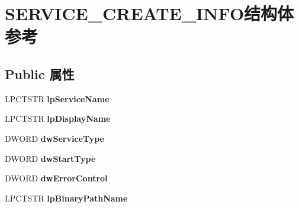 \hypertarget{struct_s_e_r_v_i_c_e___c_r_e_a_t_e___i_n_f_o}{}\section{S\+E\+R\+V\+I\+C\+E\+\_\+\+C\+R\+E\+A\+T\+E\+\_\+\+I\+N\+F\+O结构体 参考}
\label{struct_s_e_r_v_i_c_e___c_r_e_a_t_e___i_n_f_o}
\subsection*{Public 属性}
\begin{DoxyCompactItemize}
\item 
\mbox{\label{struct_s_e_r_v_i_c_e___c_r_e_a_t_e___i_n_f_o_a13f8b1a8b036ca8a352d57bd00c89f71}} 
L\+P\+C\+T\+S\+TR {\bfseries lp\+Service\+Name}
\item 
\mbox{\label{struct_s_e_r_v_i_c_e___c_r_e_a_t_e___i_n_f_o_a2c0913f2098752c80e56b44d23f64e72}} 
L\+P\+C\+T\+S\+TR {\bfseries lp\+Display\+Name}
\item 
\mbox{\label{struct_s_e_r_v_i_c_e___c_r_e_a_t_e___i_n_f_o_a0339718a3da79ed61168471585b0e8a9}} 
D\+W\+O\+RD {\bfseries dw\+Service\+Type}
\item 
\mbox{\label{struct_s_e_r_v_i_c_e___c_r_e_a_t_e___i_n_f_o_ad801772102f8029fc828d1596b6529c1}} 
D\+W\+O\+RD {\bfseries dw\+Start\+Type}
\item 
\mbox{\label{struct_s_e_r_v_i_c_e___c_r_e_a_t_e___i_n_f_o_a793e7f86a49000e29ad36103a92576ec}} 
D\+W\+O\+RD {\bfseries dw\+Error\+Control}
\item 
\mbox{\label{struct_s_e_r_v_i_c_e___c_r_e_a_t_e___i_n_f_o_add99b9135eaa0f91308ce062bc98c5ac}} 
L\+P\+C\+T\+S\+TR {\bfseries lp\+Binary\+Path\+Name}
\item 
\mbox{\label{struct_s_e_r_v_i_c_e___c_r_e_a_t_e___i_n_f_o_a3feb08c7f248161a20e4dfaf63c273f9}} 

\end{DoxyCompactItemize}
